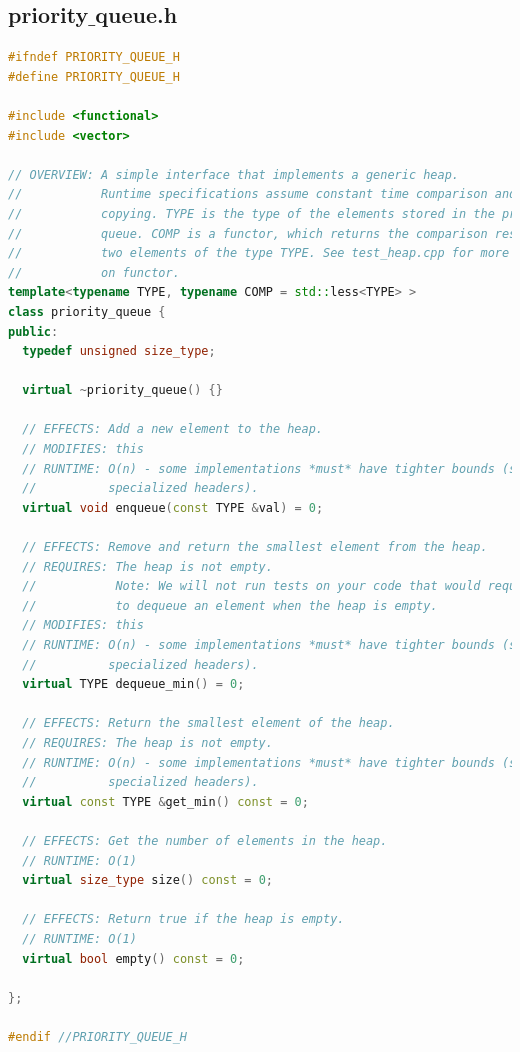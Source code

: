 \documentclass[a4paper]{article}
\begin{document}
\subsection{priority$\_{}$queue.h}
\begin{lstlisting}[language=C++] 
#ifndef PRIORITY_QUEUE_H
#define PRIORITY_QUEUE_H

#include <functional>
#include <vector>

// OVERVIEW: A simple interface that implements a generic heap.
//           Runtime specifications assume constant time comparison and
//           copying. TYPE is the type of the elements stored in the priority
//           queue. COMP is a functor, which returns the comparison result of
//           two elements of the type TYPE. See test_heap.cpp for more details
//           on functor.
template<typename TYPE, typename COMP = std::less<TYPE> >
class priority_queue {
public:
  typedef unsigned size_type;

  virtual ~priority_queue() {}

  // EFFECTS: Add a new element to the heap.
  // MODIFIES: this
  // RUNTIME: O(n) - some implementations *must* have tighter bounds (see
  //          specialized headers).
  virtual void enqueue(const TYPE &val) = 0;

  // EFFECTS: Remove and return the smallest element from the heap.
  // REQUIRES: The heap is not empty.
  //           Note: We will not run tests on your code that would require it
  //           to dequeue an element when the heap is empty.
  // MODIFIES: this
  // RUNTIME: O(n) - some implementations *must* have tighter bounds (see
  //          specialized headers).
  virtual TYPE dequeue_min() = 0;

  // EFFECTS: Return the smallest element of the heap.
  // REQUIRES: The heap is not empty.
  // RUNTIME: O(n) - some implementations *must* have tighter bounds (see
  //          specialized headers).
  virtual const TYPE &get_min() const = 0;

  // EFFECTS: Get the number of elements in the heap.
  // RUNTIME: O(1)
  virtual size_type size() const = 0;

  // EFFECTS: Return true if the heap is empty.
  // RUNTIME: O(1)
  virtual bool empty() const = 0;

};

#endif //PRIORITY_QUEUE_H

\end{lstlisting}
\end{document}
